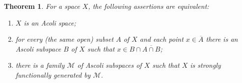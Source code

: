 \documentclass[preprint,11pt]{elsarticle}
\newtheorem{theorem}{Theorem}[section]
\numberwithin{equation}{section}
\numberwithin{theorem}{section}
\begin{document}
\begin{theorem} \label{t:characterization-Ascoli}
For a space $X$, the following assertions are equivalent:
\begin{enumerate}
\item[{\rm(i)}] $X$ is an Acoli space;
\item[{\rm(ii)}] for every {\rm(}the same open{\rm)} subset $A$ of $X$ and each point $x\in \overline{A}$ there is an Ascoli subspace $B$ of $X$ such that $x\in B\cap \overline{A\cap B}$;
\item[{\rm(iii)}] there is a family $\mathcal{M}$ of Ascoli subspaces of  $X$ such that $X$ is strongly functionally generated by $\mathcal{M}$.
\end{enumerate}
\end{theorem}
\end{document}
